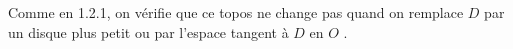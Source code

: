 \begin{center}
\end{center}
Comme en 1.2.1, on vérifie que ce topos ne change pas quand on remplace $D$ par un disque plus petit ou par l'espace tangent à $D$ en $O$ .



